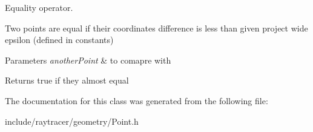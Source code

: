 Equality operator. 

Two points are equal if their coordinates difference is less than given project wide epsilon (defined in constants) 
\begin{DoxyParams}{Parameters}
{\em another\+Point} & to comapre with \\
\hline
\end{DoxyParams}
\begin{DoxyReturn}{Returns}
true if they almost equal 
\end{DoxyReturn}


The documentation for this class was generated from the following file\+:\begin{DoxyCompactItemize}
\item 
include/raytracer/geometry/Point.\+h\end{DoxyCompactItemize}
